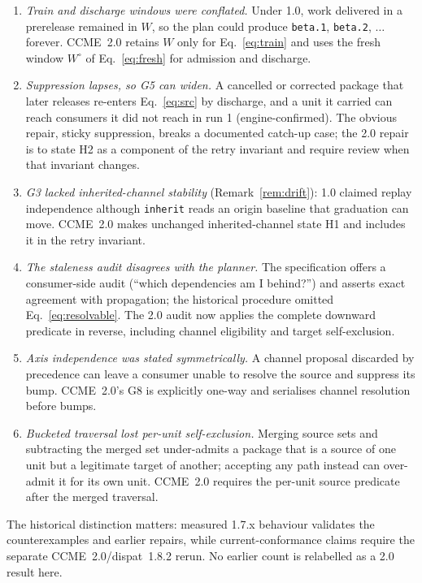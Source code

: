 \documentclass[sigconf,nonacm]{acmart}
\newcommand{\code}[1]{\texttt{#1}}
\newcommand{\G}[1]{G#1}
\begin{document}
\begin{enumerate}
  \item \emph{Train and discharge windows were conflated.} Under 1.0,
    work delivered in a prerelease remained in $W$, so the plan could
    produce \code{beta.1}, \code{beta.2}, $\ldots$ forever. CCME~2.0
    retains $W$ only for Eq.~\ref{eq:train} and uses the fresh window
    $W^\circ$ of Eq.~\ref{eq:fresh} for admission and discharge.
  \item \emph{Suppression lapses, so \G{5} can widen.} A cancelled or
    corrected package that later releases re-enters Eq.~\ref{eq:src}
    by discharge, and a unit it carried can reach consumers it did
    not reach in run 1 (engine-confirmed). The obvious repair,
    sticky suppression, breaks a documented catch-up case; the
    2.0 repair is to state H2 as a component of the retry invariant and
    require review when that invariant changes.
  \item \emph{\G{3} lacked inherited-channel stability}
    (Remark~\ref{rem:drift}): 1.0 claimed replay independence although
    \code{inherit} reads an origin baseline that graduation can move.
    CCME~2.0 makes unchanged inherited-channel state H1 and includes it
    in the retry invariant.
  \item \emph{The staleness audit disagrees with the planner.} The
    specification offers a consumer-side audit (``which dependencies
    am I behind?'') and asserts exact agreement with propagation; the
    historical procedure omitted Eq.~\ref{eq:resolvable}. The 2.0 audit
    now applies the complete downward predicate in reverse, including
    channel eligibility and target self-exclusion.
  \item \emph{Axis independence was stated symmetrically.} A channel
    proposal discarded by precedence can leave a consumer unable to
    resolve the source and suppress its bump. CCME~2.0's \G{8} is
    explicitly one-way and serialises channel resolution before bumps.
  \item \emph{Bucketed traversal lost per-unit self-exclusion.} Merging
    source sets and subtracting the merged set under-admits a package that
    is a source of one unit but a legitimate target of another; accepting
    any path instead can over-admit it for its own unit. CCME~2.0 requires
    the per-unit source predicate after the merged traversal.
\end{enumerate}

The historical distinction matters: measured 1.7.x behaviour validates the
counterexamples and earlier repairs, while current-conformance claims require
the separate CCME~2.0/dispat~1.8.2 rerun. No earlier count is relabelled as a
2.0 result here.
\end{document}
